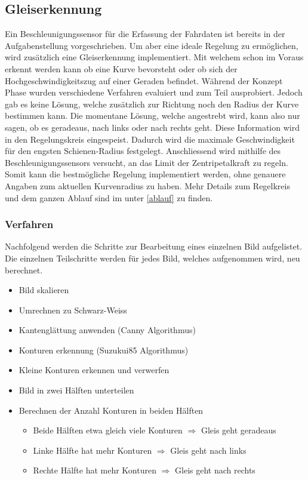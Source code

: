 \documentclass[../../main.tex]{subfiles}
\begin{document}
\subsection{Gleiserkennung}
Ein Beschleunigungssensor für die Erfassung der Fahrdaten ist bereits in der Aufgabenstellung vorgeschrieben.
Um aber eine ideale Regelung zu ermöglichen, wird zusätzlich eine Gleiserkennung implementiert. Mit welchem schon im Voraus
erkennt werden kann ob eine Kurve bevorsteht oder ob sich der Hochgeschwindigkeitszug auf einer Geraden befindet.
Während der Konzept Phase wurden verschiedene Verfahren evaluiert und zum Teil ausprobiert. Jedoch gab es keine Lösung, welche zusätzlich zur Richtung noch den Radius
der Kurve bestimmen kann. Die momentane Lösung, welche angestrebt wird, kann also nur sagen, ob es geradeaus, nach links oder nach rechts geht.
Diese Information wird in den Regelungskreis eingespeist. Dadurch wird die maximale Geschwindigkeit für den engsten Schienen-Radius festgelegt. Anschliessend wird mithilfe des Beschleunigungssensors versucht, an das Limit der Zentripetalkraft zu regeln. Somit kann die
bestmögliche Regelung implementiert werden, ohne genauere Angaben zum aktuellen Kurvenradius zu haben.
Mehr Details zum Regelkreis und dem ganzen Ablauf sind im unter \ref{ablauf} zu finden.

\subsubsection{Verfahren}
Nachfolgend werden die Schritte zur Bearbeitung eines einzelnen Bild aufgelistet.
Die einzelnen Teilschritte werden für jedes Bild, welches aufgenommen wird, neu berechnet.
\begin{itemize} %
    \item Bild skalieren
    \item Umrechnen zu Schwarz-Weiss
    \item Kantenglättung anwenden (Canny Algorithmus)
    \item Konturen erkennung (Suzukui85 Algorithmus)
    \item Kleine Konturen erkennen und verwerfen
    \item Bild in zwei Hälften unterteilen
    \item Berechnen der Anzahl Konturen in beiden Hälften
        \begin{itemize}
            \item Beide Hälften etwa gleich viele Konturen $\Rightarrow$ Gleis geht geradeaus
            \item Linke Hälfte hat mehr Konturen $\Rightarrow$ Gleis geht nach links
            \item Rechte Hälfte hat mehr Konturen $\Rightarrow$ Gleis geht nach rechts
        \end{itemize}
\end{itemize}
\end{document}
